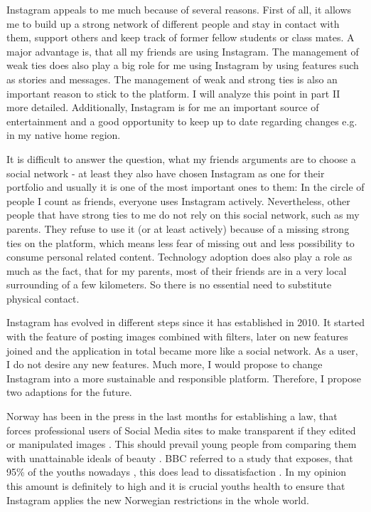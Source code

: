 \documentclass[11pt,letterpaper]{article}
\begin{document}
Instagram appeals to me much because of several reasons. First of all, it allows me to build up a strong network of different people and stay in contact with them, support others and keep track of former fellow students or class mates. A major advantage is, that all my friends are using Instagram. The management of weak ties does also play a big role for me using Instagram by using features such as stories and messages. The management of weak and strong ties is also an important reason to stick to the platform. I will analyze this point in part II more detailed. Additionally, Instagram is for me an important source of entertainment and a good opportunity to keep up to date regarding changes e.g. in my native home region.

It is difficult to answer the question, what my friends arguments are to choose a social network - at least they also have chosen Instagram as one for their portfolio and usually it is one of the most important ones to them: In the circle of people I count as friends, everyone uses Instagram actively. Nevertheless, other people that have strong ties to me do not rely on this social network, such as my parents. They refuse to use it (or at least actively) because of a missing strong ties on the platform, which means less fear of missing out and less possibility to consume personal related content. Technology adoption does also play a role as much as the fact, that for my parents, most of their friends are in a very local surrounding of a few kilometers. So there is no essential need to substitute physical contact.

Instagram has evolved in different steps since it has established in 2010. It started with the feature of posting images combined with filters, later on new features joined and the application in total became more like a social network. As a user, I do not desire any new features. Much more, I would propose to change Instagram into a more sustainable and responsible platform. Therefore, I propose two adaptions for the future.

Norway has been in the press in the last months for establishing a law, that forces professional users of Social Media sites to make transparent if they edited or manipulated images \autocite[][]{PressReynolds.2021}. This should prevail young people from comparing them with unattainable ideals of beauty \autocite[][]{PressReynolds.2021}. BBC referred to a study that exposes, that 95\% of the youths nowadays  \autocite[][]{Grant.2021}, this does lead to dissatisfaction \autocites[p. 501]{Babaleye.2020}[p. 1]{Rafati.2021}. In my opinion this amount is definitely to high and it is crucial youths health to ensure that Instagram applies the new Norwegian restrictions in the whole world.
\end{document}
